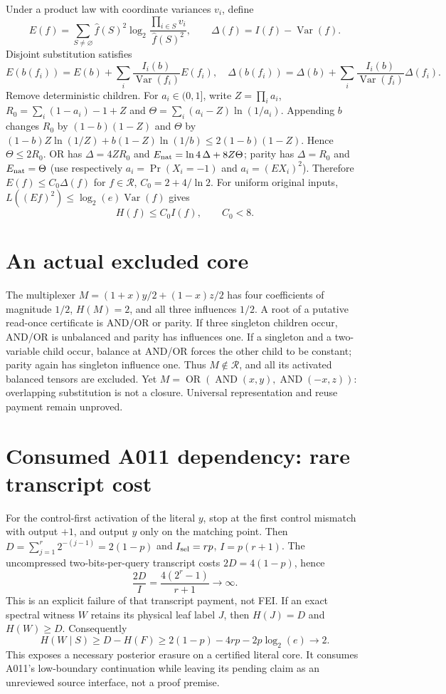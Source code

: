 \documentclass[11pt]{article}
\newcommand{\cR}{\mathcal R}
\begin{document}
Under a product law with coordinate variances $v_i$, define
\[
E(f)=\sum_{S\ne\varnothing}\widehat f(S)^2
\log_2\frac{\prod_{i\in S}v_i}{\widehat f(S)^2},
\qquad \Delta(f)=I(f)-\operatorname{Var}(f).
\]
Disjoint substitution satisfies
\[
E(b(f_i))=E(b)+\sum_i\frac{I_i(b)}{\operatorname{Var}(f_i)}E(f_i),
\quad
\Delta(b(f_i))=\Delta(b)+\sum_i\frac{I_i(b)}{\operatorname{Var}(f_i)}\Delta(f_i).
\]
Remove deterministic children. For $a_i\in(0,1]$, write
$Z=\prod_i a_i$, $R_0=\sum_i(1-a_i)-1+Z$ and
$\Theta=\sum_i(a_i-Z)\ln(1/a_i)$. Appending $b$ changes $R_0$ by
$(1-b)(1-Z)$ and $\Theta$ by
$(1-b)Z\ln(1/Z)+b(1-Z)\ln(1/b)\le2(1-b)(1-Z)$.
Hence $\Theta\le2R_0$.
OR has $\Delta=4ZR_0$ and $E_{\rm nat}=\ln4\,\Delta+8Z\Theta$;
parity has $\Delta=R_0$ and $E_{\rm nat}=\Theta$ (use respectively
$a_i=\Pr(X_i=-1)$ and $a_i=(EX_i)^2$).
Therefore $E(f)\le C_0\Delta(f)$ for $f\in\cR$,
$C_0=2+4/\ln2$. For uniform original inputs,
$L((Ef)^2)\le\log_2(e)\operatorname{Var}(f)$ gives
\[
H(f)\le C_0 I(f),\qquad C_0<8.
\]

\section*{An actual excluded core}
The multiplexer
$M=(1+x)y/2+(1-x)z/2$ has four coefficients of magnitude $1/2$,
$H(M)=2$, and all three influences $1/2$. A root of a putative
read-once certificate is AND/OR or parity. If three singleton children
occur, AND/OR is unbalanced and parity has influences one. If a singleton
and a two-variable child occur, balance at AND/OR forces the other child
to be constant; parity again has singleton influence one. Thus
$M\notin\cR$, and all its activated balanced tensors are excluded.
Yet $M=\operatorname{OR}(\operatorname{AND}(x,y),
\operatorname{AND}(-x,z))$: overlapping substitution is not a closure.
Universal representation and reuse payment remain unproved.
\section*{Consumed A011 dependency: rare transcript cost}
For the control-first activation of the literal $y$, stop at the first
control mismatch with output $+1$, and output $y$ only on the matching
point. Then $D=\sum_{j=1}^r2^{-(j-1)}=2(1-p)$ and
$I_{\rm sel}=rp$, $I=p(r+1)$. The uncompressed two-bits-per-query
transcript costs $2D=4(1-p)$, hence
\[
\frac{2D}{I}=\frac{4(2^r-1)}{r+1}\longrightarrow\infty.
\]
This is an explicit failure of that transcript payment, not FEI. If an
exact spectral witness $W$ retains its physical leaf label $J$, then
$H(J)=D$ and $H(W)\ge D$. Consequently
\[
H(W\mid S)\ge D-H(F)\ge2(1-p)-4rp-2p\log_2(e)\longrightarrow2.
\]
This exposes a necessary posterior erasure on a certified literal core.
It consumes A011's low-boundary continuation while leaving its pending
claim as an unreviewed source interface, not a proof premise.
\end{document}
